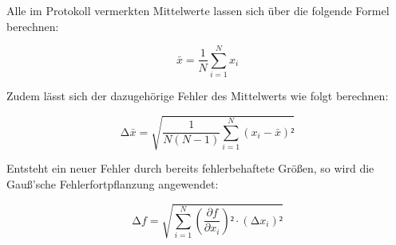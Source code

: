 Alle im Protokoll vermerkten Mittelwerte lassen sich über die folgende Formel berechnen:

\begin{equation}
\label{eqn:Mittelwert}
    \bar{x} = \frac{1}{N}\sum_{i=1}^N x_i
\end{equation}

Zudem lässt sich der dazugehörige Fehler des Mittelwerts wie folgt berechnen:

\begin{equation}
\label{eqn:Mittelwertfehler}
    \increment \bar{x} = \sqrt{\frac{1}{N\left(N-1\right)}\sum_{i=1}^N \left(x_i - \bar{x}\right)²}
\end{equation}

Entsteht ein neuer Fehler durch bereits fehlerbehaftete Größen, so wird die Gauß'sche Fehlerfortpflanzung angewendet:

\begin{equation}
\label{eqn:Fehlerfortpflanzung}
    \increment f = \sqrt{\sum_{i=1}^N \left(\frac{\partial f}{\partial x_i}\right)²\cdot\left(\increment x_i\right)²}
\end{equation}




